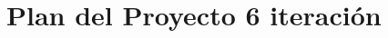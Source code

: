 \documentclass[12pt]{report}
\numberwithin{equation}{section}
\begin{document}
\pagestyle{fancy}
\renewcommand{\chaptermark}[1]{\markboth{\MakeUppercase{\chaptername}\ \thechapter.\ #1}{}}
\renewcommand{\headrulewidth}{0.2pt} 

\newcommand{\plan}{Plan del Proyecto}
\newcommand{\iso}{ISO/IEC 29110 Perfil B\'asico}
\newcommand{\isoP}{ISO/IEC 29110 Perfil B\'asico }
\newcommand{\planE}{Plan del Proyecto }
\newcommand{\implementacion}{Implementaci\'on de Software}
\newcommand{\reporte}{Reporte de seguimiento }



\setcounter{page}{26}


\newpage


\centering\section{Plan del Proyecto 6 iteraci\'on}\label{Plan del Proyecto5}
%
%
%
\end{document}
